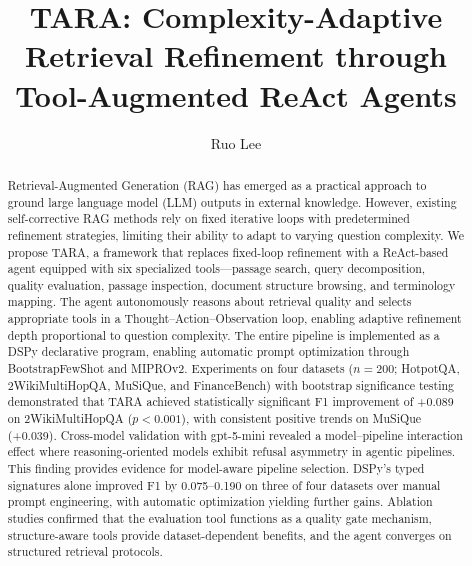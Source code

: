 \documentclass[preprint,review,number]{elsarticle}
\newcommand{\ours}{\textsc{TARA}}
\begin{document}
\begin{frontmatter}

\title{TARA: Complexity-Adaptive Retrieval Refinement through Tool-Augmented ReAct Agents}

\author[1]{Ruo Lee}


\begin{abstract}
Retrieval-Augmented Generation (RAG) has emerged as a practical approach to ground large language model (LLM) outputs in external knowledge.
However, existing self-corrective RAG methods rely on fixed iterative loops with predetermined refinement strategies, limiting their ability to adapt to varying question complexity.
We propose \ours{}, a framework that replaces fixed-loop refinement with a ReAct-based agent equipped with six specialized tools---passage search, query decomposition, quality evaluation, passage inspection, document structure browsing, and terminology mapping.
The agent autonomously reasons about retrieval quality and selects appropriate tools in a Thought--Action--Observation loop, enabling adaptive refinement depth proportional to question complexity.
The entire pipeline is implemented as a DSPy declarative program, enabling automatic prompt optimization through BootstrapFewShot and MIPROv2.
Experiments on four datasets ($n = 200$; HotpotQA, 2WikiMultiHopQA, MuSiQue, and FinanceBench) with bootstrap significance testing demonstrated that \ours{} achieved statistically significant F1 improvement of +0.089 on 2WikiMultiHopQA ($p < 0.001$), with consistent positive trends on MuSiQue (+0.039).
Cross-model validation with gpt-5-mini revealed a model--pipeline interaction effect where reasoning-oriented models exhibit refusal asymmetry in agentic pipelines. This finding provides evidence for model-aware pipeline selection.
DSPy's typed signatures alone improved F1 by 0.075--0.190 on three of four datasets over manual prompt engineering, with automatic optimization yielding further gains.
Ablation studies confirmed that the evaluation tool functions as a quality gate mechanism, structure-aware tools provide dataset-dependent benefits, and the agent converges on structured retrieval protocols.
\end{abstract}


\end{frontmatter}
\end{document}
